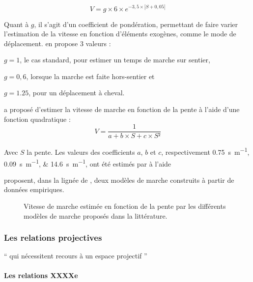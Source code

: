 \begin{equation}
  \label{eq:marche_tobler}
  V = g × 6 × e^{-3,5 × \left| S + 0,05 \right|}
\end{equation}

Quant à \(g\), il s'agit d'un coefficient de
pondération, permettant de faire varier l'estimation de la vitesse en
fonction d'éléments exogènes, comme le mode de
déplacement. \textcite{Tobler1993} en propose 3 valeurs :
%
\begin{enumerate*}[label=(\alph*)]
\item \(g = 1\), le cas standard, pour estimer un temps de marche sur
  sentier,
\item \(g = 0,6\), lorsque la marche est faite hors-sentier et
\item  \(g = 1.25\), pour un déplacement à cheval.
\end{enumerate*}

\textcite{Rees2004} a proposé d'estimer la vitesse de marche en
fonction de la pente à l'aide d'une fonction quadratique :
\begin{equation}
  V = \dfrac{1}{a + b × S + c × S²}
\end{equation}

Avec \(S\) la pente. Les valeurs des coefficients \(a\), \(b\) et
\(c\), respectivement \SIlist{0,75;0,09;14,6}{\second\per\meter}, ont
été estimés par \textcite{Rees2004} à l'aide

\textcite{Irmischer2017,Kerouanton2020} proposent, dans la lignée de
\textcite{Tobler1993}, deux modèles de marche construits à partir de
données empiriques.



\begin{figure}
  \centering 
  \caption{Vitesse de marche estimée en fonction de la pente par les
    différents modèles de marche proposés dans la littérature.}
  \label{fig:modeles_marche}
\end{figure}


\subsubsection{Les relations projectives}

\enquote{\textelp{} qui nécessitent recours à un espace projectif
  \textelp{}} \autocite[p. 18]{Duchene2019}

\paragraph{Les relations XXXXe}

